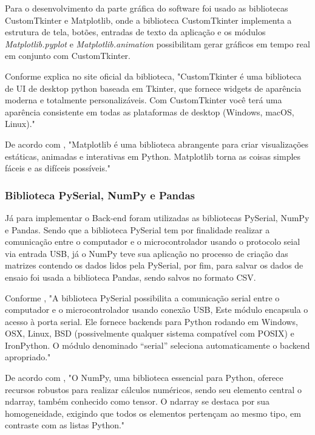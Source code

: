 Para o desenvolvimento da parte gráfica do software foi usado as bibliotecas CustomTkinter e Matplotlib, onde a biblioteca CustomTkinter implementa a estrutura de tela, botões, entradas de texto da aplicação e os módulos \textit{Matplotlib.pyplot} e \textit{Matplotlib.animation} possibilitam gerar gráficos em tempo real em conjunto com CustomTkinter.

Conforme \cite{customtkinter} explica no site oficial da biblioteca, "CustomTkinter é uma biblioteca de UI de desktop python baseada em Tkinter, que fornece widgets de aparência moderna e totalmente personalizáveis. Com CustomTkinter você terá uma aparência consistente em todas as plataformas de desktop (Windows, macOS, Linux)."

De acordo com \cite{matplotlib}, "Matplotlib é uma biblioteca abrangente para criar visualizações estáticas, animadas e interativas em Python. Matplotlib torna as coisas simples fáceis e as difíceis possíveis."

\subsubsection{Biblioteca PySerial, NumPy e Pandas}
Já para implementar o Back-end foram utilizadas as bibliotecas PySerial, NumPy e Pandas. Sendo que a biblioteca PySerial tem por finalidade realizar a comunicação entre o computador e o microcontrolador usando o protocolo seial via entrada USB, já o NumPy teve sua aplicação no processo de criação das matrizes contendo os dados lidos pela PySerial, por fim, para salvar os dados de ensaio foi usada a biblioteca Pandas, sendo salvos no formato CSV.

Conforme \cite{pyserial}, "A biblioteca PySerial possibilita a comunicação serial entre o computador e o microcontrolador usando conexão USB, Este módulo encapsula o acesso à porta serial. Ele fornece backends para Python rodando em Windows, OSX, Linux, BSD (possivelmente qualquer sistema compatível com POSIX) e IronPython. O módulo denominado “serial” seleciona automaticamente o backend apropriado."


De acordo com \cite{numpy_opl}, "O NumPy, uma biblioteca essencial para Python, oferece recursos robustos para realizar cálculos numéricos, sendo seu elemento central o ndarray, também conhecido como tensor. O ndarray se destaca por sua homogeneidade, exigindo que todos os elementos pertençam ao mesmo tipo, em contraste com as listas Python."

